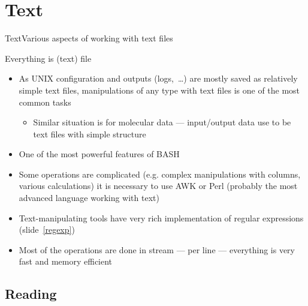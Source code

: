 \documentclass[compress, ucs, xelatex, 11pt, xcolor=svgnames,
  hyperref={
    bookmarks=true,
    unicode=true,
    colorlinks=true,
    pdftitle={Linux, command line and MetaCentrum},
    plainpages=false,
    pdfauthor={Vojtech Zeisek},
    pdfsubject={Course about use of Linux command line, writing shell scripts and using MetaCentrum of CESNET},
    pdfcreator={XeLaTeX},
    pdfkeywords={Linux, GNU, BASH, shell, command line, MetaCentrum},
    linkcolor=DarkRed,
    anchorcolor=DarkBlue,
    citecolor=Indigo,
    filecolor=NavyBlue,
    menucolor=DarkMagenta,
    urlcolor=DarkBlue,
    pdftex},
  url={hyphens, lowtilde} %
  ]{beamer}
\begin{document}
\section{Text}

\begin{frame}{Text}{Various aspects of working with text files}
  \tableofcontents[currentsection, sectionstyle=show/hide, hideothersubsections]
\end{frame}

\begin{frame}{Everything is (text) file}
  \begin{itemize}
    \item As UNIX configuration and outputs (logs,~\ldots) are mostly saved as relatively simple text files, manipulations of any type with text files is one of the most common tasks
    \begin{itemize}
      \item Similar situation is for molecular data --- input/output data use to be text files with simple structure
    \end{itemize}
    \item One of the most powerful features of BASH
    \item Some operations are complicated (e.g. complex manipulations with columns, various calculations) it is necessary to use AWK or Perl (probably the most advanced language working with text)
    \item Text-manipulating tools have very rich implementation of regular expressions (slide~\ref{regexp})
    \item Most of the operations are done in stream --- per line --- everything is very fast and memory efficient
  \end{itemize}
\end{frame}

\subsection{Reading}
\end{document}
